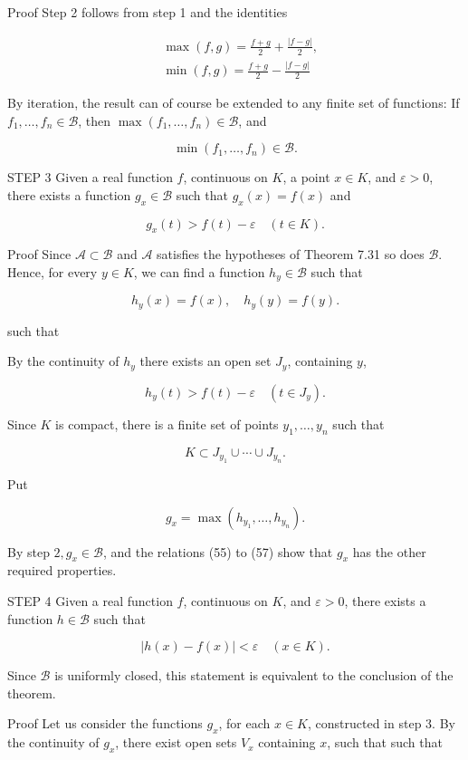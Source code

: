 \documentclass[10pt]{article}
\begin{document}
Proof Step 2 follows from step 1 and the identities

$$
\begin{aligned}
& \max (f, g)=\frac{f+g}{2}+\frac{|f-g|}{2}, \\
& \min (f, g)=\frac{f+g}{2}-\frac{|f-g|}{2}
\end{aligned}
$$

By iteration, the result can of course be extended to any finite set of functions: If $f_{1}, \ldots, f_{n} \in \mathscr{B}$, then $\max \left(f_{1}, \ldots, f_{n}\right) \in \mathscr{B}$, and

$$
\min \left(f_{1}, \ldots, f_{n}\right) \in \mathscr{B} .
$$

STEP 3 Given a real function $f$, continuous on $K$, a point $x \in K$, and $\varepsilon>0$, there exists a function $g_{x} \in \mathscr{B}$ such that $g_{x}(x)=f(x)$ and

$$
g_{x}(t)>f(t)-\varepsilon \quad(t \in K) .
$$

Proof Since $\mathscr{A} \subset \mathscr{B}$ and $\mathscr{A}$ satisfies the hypotheses of Theorem 7.31 so does $\mathscr{B}$. Hence, for every $y \in K$, we can find a function $h_{y} \in \mathscr{B}$ such that

$$
h_{y}(x)=f(x), \quad h_{y}(y)=f(y) .
$$

such that

By the continuity of $h_{y}$ there exists an open set $J_{y}$, containing $y$,

$$
h_{y}(t)>f(t)-\varepsilon \quad\left(t \in J_{y}\right) .
$$

Since $K$ is compact, there is a finite set of points $y_{1}, \ldots, y_{n}$ such that

$$
K \subset J_{y_{1}} \cup \cdots \cup J_{y_{n}} .
$$

Put

$$
g_{x}=\max \left(h_{y_{1}}, \ldots, h_{y_{n}}\right) .
$$

By step $2, g_{x} \in \mathscr{B}$, and the relations (55) to (57) show that $g_{x}$ has the other required properties.

STEP 4 Given a real function $f$, continuous on $K$, and $\varepsilon>0$, there exists a function $h \in \mathscr{B}$ such that

$$
|h(x)-f(x)|<\varepsilon \quad(x \in K) .
$$

Since $\mathscr{B}$ is uniformly closed, this statement is equivalent to the conclusion of the theorem.

Proof Let us consider the functions $g_{x}$, for each $x \in K$, constructed in step 3. By the continuity of $g_{x}$, there exist open sets $V_{x}$ containing $x$, such that such that
\end{document}
